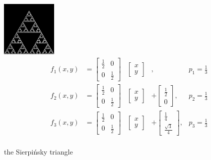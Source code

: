 \documentclass[11pt]{article}
\begin{document}
\begin{ifs}
\centering
\includegraphics[width=0.2\textwidth]{figures/sierpinsky}
$$ 
\begin{aligned}
f_1(x, y) &= \begin{bmatrix} \frac{1}{2} & 0 \\ 0 & \frac{1}{2} \end{bmatrix} & \begin{bmatrix} x \\ y \end{bmatrix} & , &p_1 = \frac{1}{3} \\
f_2(x, y) &= \begin{bmatrix} \frac{1}{2} & 0 \\ 0 & \frac{1}{2} \end{bmatrix} & \begin{bmatrix} x \\ y \end{bmatrix} &+ \begin{bmatrix} \frac{1}{2} \\ 0 \end{bmatrix} , &p_2 = \frac{1}{3} \\
f_3(x, y) &= \begin{bmatrix} \frac{1}{2} & 0 \\ 0 & \frac{1}{2} \end{bmatrix} & \begin{bmatrix} x \\ y \end{bmatrix} &+ \begin{bmatrix} \frac{1}{4} \\ \frac{\sqrt{3}}{4} \end{bmatrix} , &p_3 = \frac{1}{3} \\
\end{aligned}
$$

\caption{the Sierpi\'nsky triangle}
\label{ifs:sierpinsky}
\end{ifs}
\end{document}
